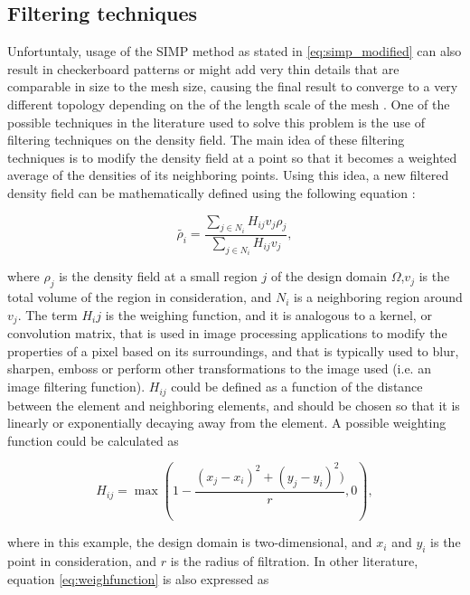 \documentclass[../main.tex]{subfiles}
\begin{document}
\subsection{Filtering techniques}

Unfortuntaly, usage of the SIMP method as stated in \ref{eq:simp_modified} can also result in checkerboard patterns or might add very thin details that are comparable in size to the mesh size, causing the final result to converge to a very different topology depending on the of the length scale of the mesh \cite{wangProjectionMethodsConvergence2011a}. One of the possible techniques in the literature used to solve this problem is the use of filtering techniques on the density field. The main idea of these filtering techniques is to modify the density field at a point so that it becomes a weighted average of the densities of its neighboring points. Using this idea, a new filtered density field can be mathematically defined using the following equation \cite{liuEfficient3DTopology2014}:

\begin{equation}
  \tilde{\rho_i} = \frac{\sum_{j \in N_i} H_{ij} v_j \rho_j} {\sum_{j \in N_i} H_{ij} v_j},
  \label{eq:densityfilter}
\end{equation}

where $\rho_j$ is the density field at a small region $j$ of the design domain $\Omega$,$v_j$ is the total volume of the region in consideration, and $N_i$ is a neighboring region around $v_j$. The term $H_ij$ is the weighing function, and it is analogous to a kernel, or convolution matrix, that is used in image processing applications to modify the properties of a pixel based on its surroundings, and that is typically used to blur, sharpen, emboss or perform other transformations to the image used (i.e. an image filtering function). $H_{ij}$ could be defined as a function of the distance between the element and neighboring elements, and should be chosen so that it is linearly or exponentially decaying away from the element. A possible weighting function could be calculated as 

\begin{equation}
  H_{ij} = \max(1 - \frac{(x_j - x_i)^2 + (y_j - y_i)^2)}{r}, 0),
  \label{eq:weighfunction}
\end{equation}

where in this example, the design domain is two-dimensional, and $x_i$ and $y_i$ is the point in consideration, and $r$ is the radius of filtration. In other literature, equation \ref{eq:weighfunction} is also expressed as \cite{liuEfficient3DTopology2014} 
\end{document}
